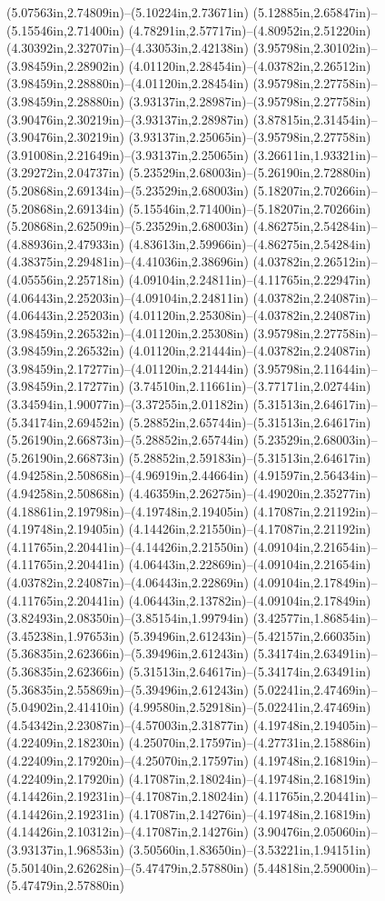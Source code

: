 (5.07563in,2.74809in)--(5.10224in,2.73671in) (5.12885in,2.65847in)--(5.15546in,2.71400in) (4.78291in,2.57717in)--(4.80952in,2.51220in) (4.30392in,2.32707in)--(4.33053in,2.42138in) (3.95798in,2.30102in)--(3.98459in,2.28902in) (4.01120in,2.28454in)--(4.03782in,2.26512in) (3.98459in,2.28880in)--(4.01120in,2.28454in) (3.95798in,2.27758in)--(3.98459in,2.28880in) (3.93137in,2.28987in)--(3.95798in,2.27758in) (3.90476in,2.30219in)--(3.93137in,2.28987in) (3.87815in,2.31454in)--(3.90476in,2.30219in) (3.93137in,2.25065in)--(3.95798in,2.27758in) (3.91008in,2.21649in)--(3.93137in,2.25065in) (3.26611in,1.93321in)--(3.29272in,2.04737in) (5.23529in,2.68003in)--(5.26190in,2.72880in) (5.20868in,2.69134in)--(5.23529in,2.68003in) (5.18207in,2.70266in)--(5.20868in,2.69134in) (5.15546in,2.71400in)--(5.18207in,2.70266in) (5.20868in,2.62509in)--(5.23529in,2.68003in) (4.86275in,2.54284in)--(4.88936in,2.47933in) (4.83613in,2.59966in)--(4.86275in,2.54284in) (4.38375in,2.29481in)--(4.41036in,2.38696in) (4.03782in,2.26512in)--(4.05556in,2.25718in) (4.09104in,2.24811in)--(4.11765in,2.22947in) (4.06443in,2.25203in)--(4.09104in,2.24811in) (4.03782in,2.24087in)--(4.06443in,2.25203in) (4.01120in,2.25308in)--(4.03782in,2.24087in) (3.98459in,2.26532in)--(4.01120in,2.25308in) (3.95798in,2.27758in)--(3.98459in,2.26532in) (4.01120in,2.21444in)--(4.03782in,2.24087in) (3.98459in,2.17277in)--(4.01120in,2.21444in) (3.95798in,2.11644in)--(3.98459in,2.17277in) (3.74510in,2.11661in)--(3.77171in,2.02744in) (3.34594in,1.90077in)--(3.37255in,2.01182in) (5.31513in,2.64617in)--(5.34174in,2.69452in) (5.28852in,2.65744in)--(5.31513in,2.64617in) (5.26190in,2.66873in)--(5.28852in,2.65744in) (5.23529in,2.68003in)--(5.26190in,2.66873in) (5.28852in,2.59183in)--(5.31513in,2.64617in) (4.94258in,2.50868in)--(4.96919in,2.44664in) (4.91597in,2.56434in)--(4.94258in,2.50868in) (4.46359in,2.26275in)--(4.49020in,2.35277in) (4.18861in,2.19798in)--(4.19748in,2.19405in) (4.17087in,2.21192in)--(4.19748in,2.19405in) (4.14426in,2.21550in)--(4.17087in,2.21192in) (4.11765in,2.20441in)--(4.14426in,2.21550in) (4.09104in,2.21654in)--(4.11765in,2.20441in) (4.06443in,2.22869in)--(4.09104in,2.21654in) (4.03782in,2.24087in)--(4.06443in,2.22869in) (4.09104in,2.17849in)--(4.11765in,2.20441in) (4.06443in,2.13782in)--(4.09104in,2.17849in) (3.82493in,2.08350in)--(3.85154in,1.99794in) (3.42577in,1.86854in)--(3.45238in,1.97653in) (5.39496in,2.61243in)--(5.42157in,2.66035in) (5.36835in,2.62366in)--(5.39496in,2.61243in) (5.34174in,2.63491in)--(5.36835in,2.62366in) (5.31513in,2.64617in)--(5.34174in,2.63491in) (5.36835in,2.55869in)--(5.39496in,2.61243in) (5.02241in,2.47469in)--(5.04902in,2.41410in) (4.99580in,2.52918in)--(5.02241in,2.47469in) (4.54342in,2.23087in)--(4.57003in,2.31877in) (4.19748in,2.19405in)--(4.22409in,2.18230in) (4.25070in,2.17597in)--(4.27731in,2.15886in) (4.22409in,2.17920in)--(4.25070in,2.17597in) (4.19748in,2.16819in)--(4.22409in,2.17920in) (4.17087in,2.18024in)--(4.19748in,2.16819in) (4.14426in,2.19231in)--(4.17087in,2.18024in) (4.11765in,2.20441in)--(4.14426in,2.19231in) (4.17087in,2.14276in)--(4.19748in,2.16819in) (4.14426in,2.10312in)--(4.17087in,2.14276in) (3.90476in,2.05060in)--(3.93137in,1.96853in) (3.50560in,1.83650in)--(3.53221in,1.94151in) (5.50140in,2.62628in)--(5.47479in,2.57880in) (5.44818in,2.59000in)--(5.47479in,2.57880in) 